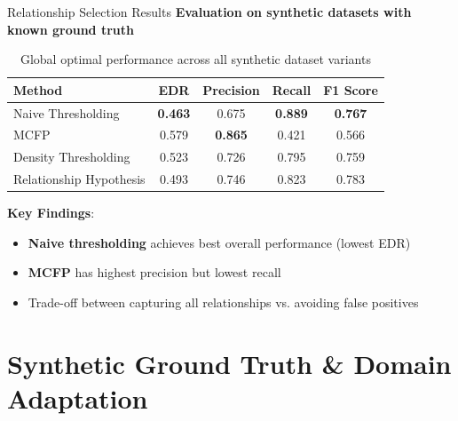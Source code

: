 \documentclass[aspectratio=169]{beamer}
\begin{document}
\begin{frame}{Relationship Selection Results}
    \textbf{Evaluation on synthetic datasets with known ground truth}

    \vspace{0.5em}

    \begin{table}[h]
        \centering
        \scriptsize
        \begin{tabular}{lcccc}
            \toprule
            \textbf{Method}         & \textbf{EDR}   & \textbf{Precision} & \textbf{Recall} & \textbf{F1 Score} \\
            \midrule
            Naive Thresholding      & \textbf{0.463} & 0.675              & \textbf{0.889}  & \textbf{0.767}    \\
            MCFP                    & 0.579          & \textbf{0.865}     & 0.421           & 0.566             \\
            Density Thresholding    & 0.523          & 0.726              & 0.795           & 0.759             \\
            Relationship Hypothesis & 0.493          & 0.746              & 0.823           & 0.783             \\
            \bottomrule
        \end{tabular}
        \caption{Global optimal performance across all synthetic dataset variants}
    \end{table}

    \vspace{0.5em}

    \textbf{Key Findings}:
    \begin{itemize}
        \item \textbf{Naive thresholding} achieves best overall performance (lowest EDR)
        \item \textbf{MCFP} has highest precision but lowest recall
        \item Trade-off between capturing all relationships vs. avoiding false positives
    \end{itemize}
\end{frame}

\section{Synthetic Ground Truth \& Domain Adaptation}
\end{document}
